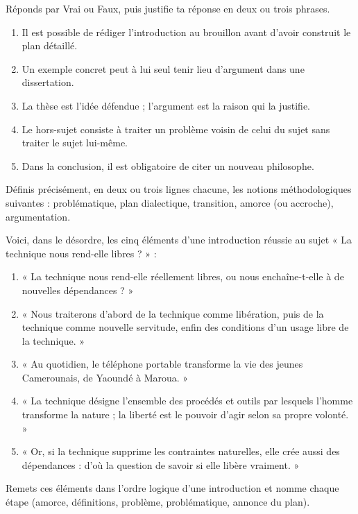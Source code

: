 \documentclass[11pt]{article}
\newcommand{\cle}[1]{{\popxbold\color{popdark}#1}}
\begin{document}
\begin{exercice}
Réponds par Vrai ou Faux, puis justifie ta réponse en deux ou trois phrases.
\begin{enumerate}
\item Il est possible de rédiger l'introduction au brouillon avant d'avoir construit le plan détaillé.
\item Un exemple concret peut à lui seul tenir lieu d'argument dans une dissertation.
\item La thèse est l'idée défendue ; l'argument est la raison qui la justifie.
\item Le hors-sujet consiste à traiter un problème voisin de celui du sujet sans traiter le sujet lui-même.
\item Dans la conclusion, il est obligatoire de citer un nouveau philosophe.
\end{enumerate}
\end{exercice}

\begin{exercice}[Définitions]
Définis précisément, en deux ou trois lignes chacune, les notions méthodologiques suivantes : \cle{problématique}, \cle{plan dialectique}, \cle{transition}, \cle{amorce} (ou accroche), \cle{argumentation}.
\end{exercice}

\begin{exercice}
Voici, dans le désordre, les cinq éléments d'une introduction réussie au sujet « La technique nous rend-elle libres ? » :
\begin{enumerate}
\item[a)] « La technique nous rend-elle réellement libres, ou nous enchaîne-t-elle à de nouvelles dépendances ? »
\item[b)] « Nous traiterons d'abord de la technique comme libération, puis de la technique comme nouvelle servitude, enfin des conditions d'un usage libre de la technique. »
\item[c)] « Au quotidien, le téléphone portable transforme la vie des jeunes Camerounais, de Yaoundé à Maroua. »
\item[d)] « La technique désigne l'ensemble des procédés et outils par lesquels l'homme transforme la nature ; la liberté est le pouvoir d'agir selon sa propre volonté. »
\item[e)] « Or, si la technique supprime les contraintes naturelles, elle crée aussi des dépendances : d'où la question de savoir si elle libère vraiment. »
\end{enumerate}
Remets ces éléments dans l'ordre logique d'une introduction et nomme chaque étape (amorce, définitions, problème, problématique, annonce du plan).
\end{exercice}
\end{document}
